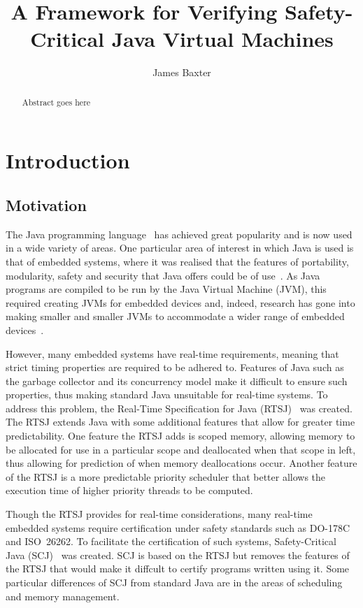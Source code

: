 \documentclass[a4paper,10pt]{report}
\title{A Framework for Verifying Safety-Critical Java Virtual Machines}
\author{James Baxter}
\date{}
\begin{document}
\maketitle

\begin{abstract}
  Abstract goes here
\end{abstract}

\tableofcontents

\chapter{Introduction}


\section{Motivation}

The Java programming language~\cite{gosling2013} has achieved great
popularity and is now used in a wide variety of areas.
One particular area of interest in which Java is used is that of
embedded systems, where it was realised that the features of
portability, modularity, safety and security that Java offers could be
of use~\cite{mulchandani1998}.
As Java programs are compiled to be run by the Java Virtual Machine
(JVM), this required creating JVMs for embedded devices and, indeed,
research has gone into making smaller and smaller JVMs to accommodate
a wider range of embedded devices~\cite{caska2011,thomm2010}.

However, many embedded systems have real-time requirements, meaning
that strict timing properties are required to be adhered to.
Features of Java such as the garbage collector and its concurrency
model make it difficult to ensure such properties, thus making
standard Java unsuitable for real-time systems.
To address this problem, the Real-Time Specification for Java
(RTSJ)~\cite{gosling2000} was created.
The RTSJ extends Java with some additional features that allow for
greater time predictability.
One feature the RTSJ adds is scoped memory, allowing memory to be
allocated for use in a particular scope and deallocated when that
scope in left, thus allowing for prediction of when memory
deallocations occur.
Another feature of the RTSJ is a more predictable priority scheduler
that better allows the execution time of higher priority threads to be
computed.

Though the RTSJ provides for real-time considerations, many real-time
embedded systems require certification under safety standards such as
\mbox{DO-178C} and ISO~26262.
To facilitate the certification of such systems, Safety-Critical Java
(SCJ)~\cite{locke2013} was created.
SCJ is based on the RTSJ but removes the features of the RTSJ that
would make it diffcult to certify programs written using it.
Some particular differences of SCJ from standard Java are in the areas
of scheduling and memory management.
\end{document}
